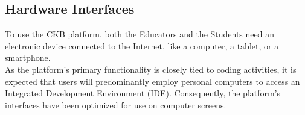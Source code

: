 

\subsection{Hardware Interfaces}
To use the CKB platform, both the Educators and the Students need an electronic device connected to the Internet, like a computer, a tablet, or a smartphone.\\
As the platform's primary functionality is closely tied to coding activities, it is expected that users will predominantly employ personal computers to access an Integrated Development Environment (IDE).
Consequently, the platform's interfaces have been optimized for use on computer screens.

